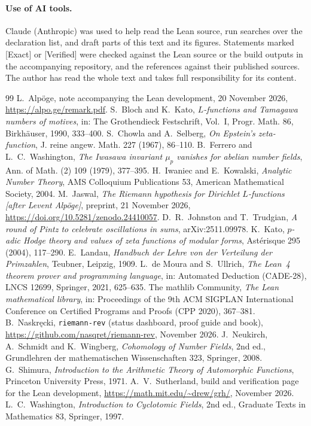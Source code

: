 \documentclass[11pt]{article}
\newcommand{\Exact}{\textcolor{exactc}{\textsf{\small[Exact]}}}
\newcommand{\Verified}{\textcolor{verc}{\textsf{\small[Verified]}}}
\theoremstyle{plain}
\theoremstyle{definition}
\begin{document}
\paragraph{Use of AI tools.} Claude (Anthropic) was used to help read the Lean source, run
searches over the declaration list, and draft parts of this text and its figures. Statements marked
\Exact{} or \Verified{} were checked against the Lean source or the build outputs in the
accompanying repository, and the references against their published sources. The author has read
the whole text and takes full responsibility for its content.

\begin{thebibliography}{99}
 L.~Alp\"oge, note accompanying the Lean development, 20 November 2026,
  \url{https://alpo.ge/remark.pdf}.
 S.~Bloch and K.~Kato, \emph{$L$-functions and Tamagawa numbers of motives}, in:
  The Grothendieck Festschrift, Vol.~I, Progr. Math. 86, Birkh\"auser, 1990, 333--400.
 S.~Chowla and A.~Selberg, \emph{On Epstein's zeta-function}, J. reine angew.
  Math. 227 (1967), 86--110.
 B.~Ferrero and L.~C.~Washington, \emph{The Iwasawa invariant $\mu_p$
  vanishes for abelian number fields}, Ann. of Math. (2) 109 (1979), 377--395.
 H.~Iwaniec and E.~Kowalski, \emph{Analytic Number Theory}, AMS Colloquium
  Publications 53, American Mathematical Society, 2004.
 M.~Jaswal, \emph{The Riemann hypothesis for Dirichlet $L$-functions [after Levent
  Alp\"oge]}, preprint, 21 November 2026, \url{https://doi.org/10.5281/zenodo.24410057}.
 D.~R.~Johnston and T.~Trudgian, \emph{A round of Pintz to celebrate
  oscillations in sums}, arXiv:2511.09978.
 K.~Kato, \emph{$p$-adic Hodge theory and values of zeta functions of modular forms},
  Ast\'erisque 295 (2004), 117--290.
 E.~Landau, \emph{Handbuch der Lehre von der Verteilung der Primzahlen}, Teubner,
  Leipzig, 1909.
 L.~de Moura and S.~Ullrich, \emph{The Lean~4 theorem prover and programming
  language}, in: Automated Deduction (CADE-28), LNCS 12699, Springer, 2021, 625--635.
 The mathlib Community, \emph{The Lean mathematical library}, in: Proceedings of the
  9th ACM SIGPLAN International Conference on Certified Programs and Proofs (CPP 2020), 367--381.
 B.~Naskr\k{e}cki, \texttt{riemann-rev} (status dashboard, proof guide and book),
  \url{https://github.com/nasqret/riemann-rev}, November 2026.
 J.~Neukirch, A.~Schmidt and K.~Wingberg, \emph{Cohomology of Number Fields}, 2nd ed.,
  Grundlehren der mathematischen Wissenschaften 323, Springer, 2008.
 G.~Shimura, \emph{Introduction to the Arithmetic Theory of Automorphic Functions},
  Princeton University Press, 1971.
 A.~V.~Sutherland, build and verification page for the Lean development,
  \url{https://math.mit.edu/~drew/grh/}, November 2026.
 L.~C.~Washington, \emph{Introduction to Cyclotomic Fields}, 2nd ed., Graduate
  Texts in Mathematics 83, Springer, 1997.
\end{thebibliography}
\end{document}
